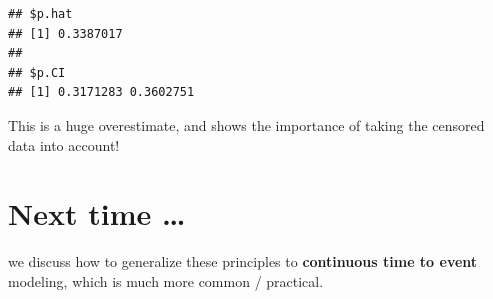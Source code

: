 \documentclass[]{tufte-handout}
\newenvironment{Shaded}{}{}
\newcommand{\AttributeTok}[1]{\textcolor[rgb]{0.49,0.56,0.16}{#1}}
\newcommand{\ConstantTok}[1]{\textcolor[rgb]{0.53,0.00,0.00}{#1}}
\newcommand{\DecValTok}[1]{\textcolor[rgb]{0.25,0.63,0.44}{#1}}
\newcommand{\FloatTok}[1]{\textcolor[rgb]{0.25,0.63,0.44}{#1}}
\newcommand{\FunctionTok}[1]{\textcolor[rgb]{0.02,0.16,0.49}{#1}}
\newcommand{\NormalTok}[1]{#1}
\newcommand{\OtherTok}[1]{\textcolor[rgb]{0.00,0.44,0.13}{#1}}
\newcommand{\SpecialCharTok}[1]{\textcolor[rgb]{0.25,0.44,0.63}{#1}}
\newcommand{\StringTok}[1]{\textcolor[rgb]{0.25,0.44,0.63}{#1}}
\begin{document}
\begin{Shaded}
\end{Shaded}

\begin{verbatim}
## $p.hat
## [1] 0.3387017
## 
## $p.CI
## [1] 0.3171283 0.3602751
\end{verbatim}

This is a huge overestimate, and shows the importance of taking the
censored data into account!

\section{Next time \ldots{}}\label{next-time}

we discuss how to generalize these principles to \textbf{continuous time
to event} modeling, which is much more common / practical.
\end{document}
